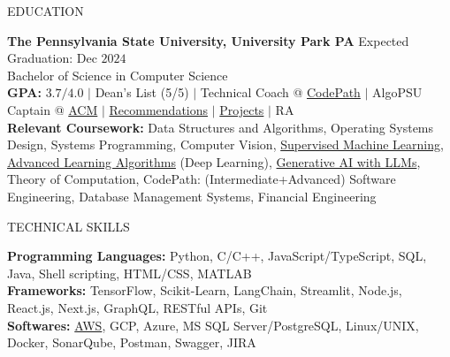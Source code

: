 \documentclass{resume} %
\begin{document}

\begin{rSection}{EDUCATION}

{\bf The Pennsylvania State University, University Park PA} \hfill {Expected Graduation: Dec $2024$}\\
{Bachelor of Science in Computer Science}\\
{\bf GPA:} $3.7/4.0$ $\vert$ Dean's List (5/5) $\vert$ Technical Coach @ \href{https://www.codepath.org/en-us/volunteers/technical-interview-coaching}{CodePath} $\vert$ AlgoPSU Captain @ \href{https://acm.psu.edu/algopsu/}{ACM} $\vert$ \href{https://www.linkedin.com/in/harshitjain17/details/recommendations/}{Recommendations} $\vert$ \href{https://www.linkedin.com/in/harshitjain17/details/projects/}{Projects} $\vert$ RA \\
{\bf Relevant Coursework:} Data Structures and Algorithms, Operating Systems Design, Systems Programming, Computer Vision, \href{https://www.coursera.org/account/accomplishments/verify/JYX5UB5YP4YD}{Supervised Machine Learning}, \href{https://www.coursera.org/account/accomplishments/records/PBF4QN2KQL4Z}{Advanced Learning Algorithms} (Deep Learning), \href{https://www.coursera.org/account/accomplishments/verify/3W6HA4ZC7UTY}{Generative AI with LLMs}, Theory of Computation, CodePath: (Intermediate+Advanced) Software Engineering, Database Management Systems, Financial Engineering

\end{rSection}


\begin{rSection}{TECHNICAL SKILLS}

{\bf Programming Languages:} Python, C/C++, JavaScript/TypeScript, SQL, Java, Shell scripting, HTML/CSS, MATLAB\\
{\bf Frameworks:} TensorFlow, Scikit-Learn, LangChain, Streamlit, Node.js, React.js, Next.js, GraphQL, RESTful APIs, Git\\
{\bf Softwares:} \href{https://www.coursera.org/account/accomplishments/verify/7L8L8YQTMCPZ}{AWS}, GCP, Azure, MS SQL Server/PostgreSQL, Linux/UNIX, Docker, SonarQube, Postman, Swagger, JIRA

\end{rSection}
\end{document}
